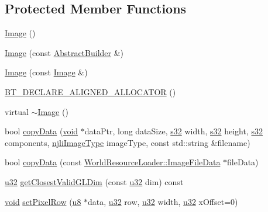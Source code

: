 \subsection*{Protected Member Functions}
\begin{DoxyCompactItemize}
\item 
\mbox{\hyperlink{classnjli_1_1_image_ab4a9a3dbcd9300dba94c600c89ee6eff}{Image}} ()
\item 
\mbox{\hyperlink{classnjli_1_1_image_a93bd5b6d3f6955819dad53bae0b2b724}{Image}} (const \mbox{\hyperlink{classnjli_1_1_abstract_builder}{Abstract\+Builder}} \&)
\item 
\mbox{\hyperlink{classnjli_1_1_image_a70b449b0a21208c1da192eaa069f49f9}{Image}} (const \mbox{\hyperlink{classnjli_1_1_image}{Image}} \&)
\item 
\mbox{\hyperlink{classnjli_1_1_image_ad1fcb460b23906d590ba8dfc84d9decc}{B\+T\+\_\+\+D\+E\+C\+L\+A\+R\+E\+\_\+\+A\+L\+I\+G\+N\+E\+D\+\_\+\+A\+L\+L\+O\+C\+A\+T\+OR}} ()
\item 
virtual \mbox{\hyperlink{classnjli_1_1_image_a53e6a2614b1db0ccb9ca56115c4b4217}{$\sim$\+Image}} ()
\item 
bool \mbox{\hyperlink{classnjli_1_1_image_a08bff06bf26c8fd8b7595e02051dd1e8}{copy\+Data}} (\mbox{\hyperlink{_thread_8h_af1e856da2e658414cb2456cb6f7ebc66}{void}} $\ast$data\+Ptr, long data\+Size, \mbox{\hyperlink{_util_8h_aa62c75d314a0d1f37f79c4b73b2292e2}{s32}} width, \mbox{\hyperlink{_util_8h_aa62c75d314a0d1f37f79c4b73b2292e2}{s32}} height, \mbox{\hyperlink{_util_8h_aa62c75d314a0d1f37f79c4b73b2292e2}{s32}} components, \mbox{\hyperlink{namespacenjli_a709a24b63b768ce1cdff54f7f48d3c0b}{njli\+Image\+Type}} image\+Type, const std\+::string \&filename)
\item 
bool \mbox{\hyperlink{classnjli_1_1_image_a2c286ee7b39964ce40a14fab298e707a}{copy\+Data}} (const \mbox{\hyperlink{structnjli_1_1_world_resource_loader_1_1_image_file_data}{World\+Resource\+Loader\+::\+Image\+File\+Data}} $\ast$file\+Data)
\item 
\mbox{\hyperlink{_util_8h_a10e94b422ef0c20dcdec20d31a1f5049}{u32}} \mbox{\hyperlink{classnjli_1_1_image_abe53fce5ad9ff94848f5f1638079b94a}{get\+Closest\+Valid\+G\+L\+Dim}} (const \mbox{\hyperlink{_util_8h_a10e94b422ef0c20dcdec20d31a1f5049}{u32}} dim) const
\item 
\mbox{\hyperlink{_thread_8h_af1e856da2e658414cb2456cb6f7ebc66}{void}} \mbox{\hyperlink{classnjli_1_1_image_a795757e6b8ced8be19cfb1cab560ffd4}{set\+Pixel\+Row}} (\mbox{\hyperlink{_util_8h_aed742c436da53c1080638ce6ef7d13de}{u8}} $\ast$data, \mbox{\hyperlink{_util_8h_a10e94b422ef0c20dcdec20d31a1f5049}{u32}} row, \mbox{\hyperlink{_util_8h_a10e94b422ef0c20dcdec20d31a1f5049}{u32}} width, \mbox{\hyperlink{_util_8h_a10e94b422ef0c20dcdec20d31a1f5049}{u32}} x\+Offset=0)

\end{DoxyCompactItemize}
